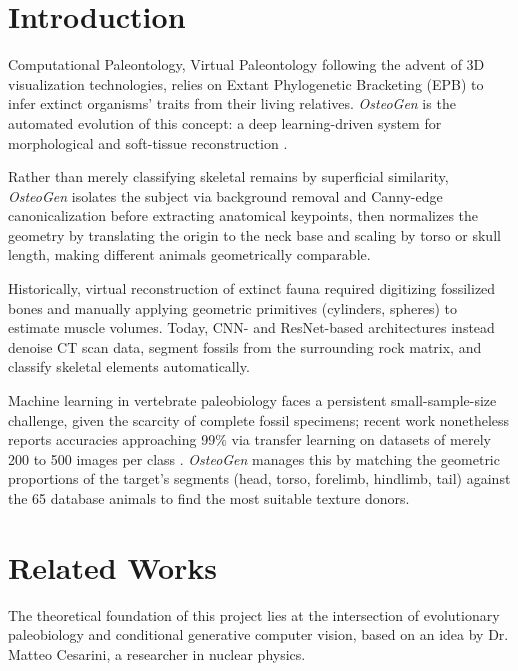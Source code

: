 \documentclass{article}
\begin{document}
\section{Introduction}
\label{sec:intro}
Computational Paleontology, Virtual Paleontology following the advent of 3D visualization technologies, relies on Extant Phylogenetic Bracketing (EPB) to infer extinct organisms' traits from their living relatives. \textit{OsteoGen} is the automated evolution of this concept: a deep learning-driven system for morphological and soft-tissue reconstruction \cite{Paleogical_3D_reconstruction}.

Rather than merely classifying skeletal remains by superficial similarity, \textit{OsteoGen} isolates the subject via background removal and Canny-edge canonicalization before extracting anatomical keypoints, then normalizes the geometry by translating the origin to the neck base and scaling by torso or skull length, making different animals geometrically comparable.

Historically, virtual reconstruction of extinct fauna required digitizing fossilized bones and manually applying geometric primitives (cylinders, spheres) to estimate muscle volumes. Today, CNN- and ResNet-based architectures instead denoise CT scan data, segment fossils from the surrounding rock matrix, and classify skeletal elements automatically.

Machine learning in vertebrate paleobiology faces a persistent small-sample-size challenge, given the scarcity of complete fossil specimens; recent work nonetheless reports accuracies approaching 99\% via transfer learning on datasets of merely 200 to 500 images per class \cite{AI_Paleontology}. \textit{OsteoGen} manages this by matching the geometric proportions of the target's segments (head, torso, forelimb, hindlimb, tail) against the 65 database animals to find the most suitable texture donors.


\section{Related Works}

The theoretical foundation of this project lies at the intersection of evolutionary paleobiology and conditional generative computer vision, based on an idea by Dr. Matteo Cesarini, a researcher in nuclear physics.
\end{document}
